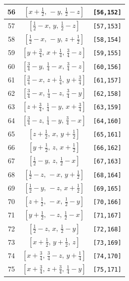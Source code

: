 \documentclass[fleqn,8pt]{jsarticle}
\begin{document}
\begin{longtable}{ccc}
56 & $\left[ x + \frac{1}{2},\, - y,\, \frac{1}{2} - z \right]$ & {\tt [56,152]} \\ \hline
57 & $\left[ \frac{1}{2} - x,\, y,\, \frac{1}{2} - z \right]$ & {\tt [57,153]} \\ \hline
58 & $\left[ \frac{1}{2} - x,\, - y,\, z + \frac{1}{2} \right]$ & {\tt [58,154]} \\ \hline
59 & $\left[ y + \frac{3}{4},\, x + \frac{1}{4},\, \frac{3}{4} - z \right]$ & {\tt [59,155]} \\ \hline
60 & $\left[ \frac{3}{4} - y,\, \frac{1}{4} - x,\, \frac{3}{4} - z \right]$ & {\tt [60,156]} \\ \hline
61 & $\left[ \frac{3}{4} - x,\, z + \frac{1}{4},\, y + \frac{3}{4} \right]$ & {\tt [61,157]} \\ \hline
62 & $\left[ \frac{3}{4} - x,\, \frac{1}{4} - z,\, \frac{3}{4} - y \right]$ & {\tt [62,158]} \\ \hline
63 & $\left[ z + \frac{3}{4},\, \frac{1}{4} - y,\, x + \frac{3}{4} \right]$ & {\tt [63,159]} \\ \hline
64 & $\left[ \frac{3}{4} - z,\, \frac{1}{4} - y,\, \frac{3}{4} - x \right]$ & {\tt [64,160]} \\ \hline
65 & $\left[ z + \frac{1}{2},\, x,\, y + \frac{1}{2} \right]$ & {\tt [65,161]} \\ \hline
66 & $\left[ y + \frac{1}{2},\, z,\, x + \frac{1}{2} \right]$ & {\tt [66,162]} \\ \hline
67 & $\left[ \frac{1}{2} - y,\, z,\, \frac{1}{2} - x \right]$ & {\tt [67,163]} \\ \hline
68 & $\left[ \frac{1}{2} - z,\, - x,\, y + \frac{1}{2} \right]$ & {\tt [68,164]} \\ \hline
69 & $\left[ \frac{1}{2} - y,\, - z,\, x + \frac{1}{2} \right]$ & {\tt [69,165]} \\ \hline
70 & $\left[ z + \frac{1}{2},\, - x,\, \frac{1}{2} - y \right]$ & {\tt [70,166]} \\ \hline
71 & $\left[ y + \frac{1}{2},\, - z,\, \frac{1}{2} - x \right]$ & {\tt [71,167]} \\ \hline
72 & $\left[ \frac{1}{2} - z,\, x,\, \frac{1}{2} - y \right]$ & {\tt [72,168]} \\ \hline
73 & $\left[ x + \frac{1}{2},\, y + \frac{1}{2},\, z \right]$ & {\tt [73,169]} \\ \hline
74 & $\left[ x + \frac{3}{4},\, \frac{3}{4} - z,\, y + \frac{1}{4} \right]$ & {\tt [74,170]} \\ \hline
75 & $\left[ x + \frac{3}{4},\, z + \frac{3}{4},\, \frac{1}{4} - y \right]$ & {\tt [75,171]} \\ \hline

\end{longtable}
\end{document}
